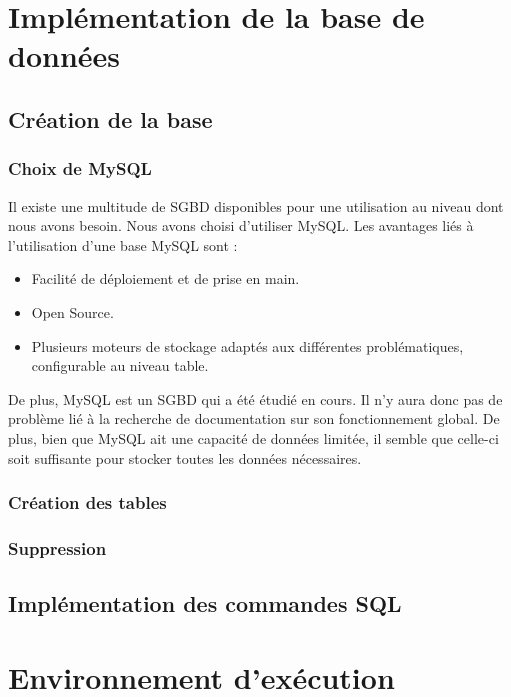 \documentclass{article}
\begin{document}
\section{Implémentation de la base de données}
\subsection{Création de la base}

\subsubsection*{Choix de MySQL}
Il existe une multitude de SGBD disponibles pour une utilisation au niveau dont nous avons besoin. Nous avons choisi d'utiliser MySQL. Les avantages liés à l'utilisation d'une base MySQL sont :
\begin{itemize}
\item Facilité de déploiement et de prise en main.
\item Open Source.
\item Plusieurs moteurs de stockage adaptés aux différentes problématiques, configurable au niveau table. \\
\end{itemize}

De plus, MySQL est un SGBD qui a été étudié en cours. Il n'y aura donc pas de problème lié à la recherche de documentation sur son fonctionnement global. De plus, bien que MySQL ait une capacité de données limitée, il semble que celle-ci soit suffisante pour stocker toutes les données nécessaires.

\subsubsection*{Création des tables}

\subsubsection*{Suppression}
\subsection{Implémentation des commandes SQL}

\section{Environnement d'exécution}
\end{document}
